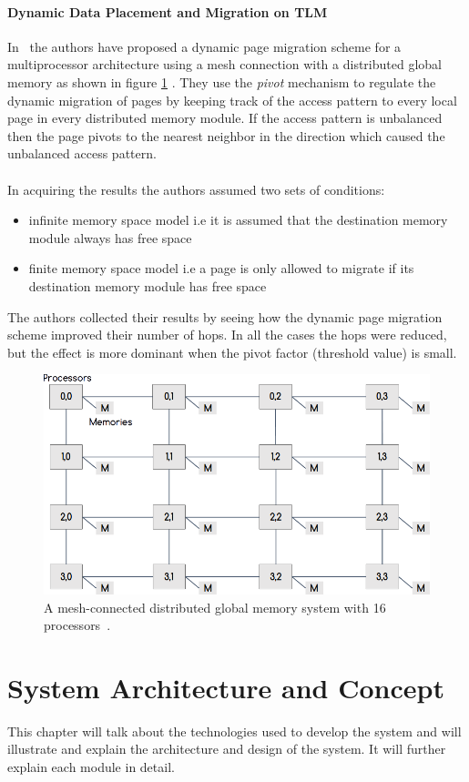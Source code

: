 \documentclass{listhesis}
\begin{document}
\subsubsection{Dynamic Data Placement and Migration on TLM}
In~\cite{dynamicPageMigration} the authors have proposed a dynamic page migration scheme for a multiprocessor architecture using a mesh connection with a distributed global memory as shown in figure \ref{fig:mesh} . They use the \textit{pivot} mechanism to regulate the dynamic migration of pages by keeping track of the access pattern to every local page in every distributed memory module. If the access pattern is unbalanced then the page pivots to the nearest neighbor in the direction which caused the unbalanced access pattern.\\
\\
In acquiring the results the authors assumed two sets of conditions:
\begin{itemize}
	\item infinite memory space model i.e it is assumed that the destination memory module always has free space
	\item finite memory space model i.e a page is only allowed to migrate if its destination memory module has free space
\end{itemize}
The authors collected their results by seeing how the dynamic page migration scheme improved their number of hops. In all the cases the hops were reduced, but the effect is more dominant when the pivot factor (threshold value) is small.\\
\begin{figure}
  \includegraphics[width=0.7\linewidth]{meshconnected.png}
  \centering
  \caption{A mesh-connected distributed global memory system with 16 processors~\cite{dynamicPageMigration}.}
  \label{fig:mesh}
\end{figure}
\chapter{System Architecture and Concept}
This chapter will talk about the technologies used to develop the system and will illustrate and explain the architecture and design of the system. It will further explain each module in detail.
\end{document}
